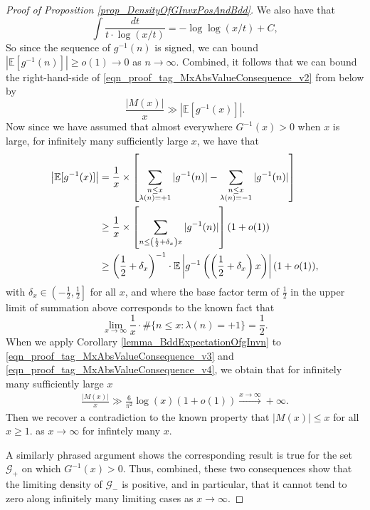 \documentclass[11pt,reqno,a4letter]{article}
\numberwithin{figure}{section}
\numberwithin{table}{section}
\theoremstyle{plain}
\numberwithin{theorem}{section}
\theoremstyle{definition}
\begin{document}
\begin{proof}[Proof of Proposition \ref{prop_DensityOfGInvxPosAndBdd}]
We also have that  
\[
\int \frac{dt}{t \cdot \log(x/t)} = -\log\log(x/t) + C, 
\]
So since the sequence of $g^{-1}(n)$ is signed, we can bound 
$|\mathbb{E}[g^{-1}(n)]| \geq o(1) \rightarrow 0$ as $n \rightarrow \infty$. 
Combined, it follows that we can bound the right-hand-side of 
\eqref{eqn_proof_tag_MxAbsValueConsequence_v2} from below by 
\begin{equation} 
\label{eqn_proof_tag_MxAbsValueConsequence_v3} 
\frac{|M(x)|}{x} \gg \left\lvert \mathbb{E}[g^{-1}(x)] \right\rvert. 
\end{equation} 
Now since we have assumed that almost everywhere $G^{-1}(x) > 0$ when $x$ is large, 
for infinitely many sufficiently large $x$, we have that 
\begin{align} 
\notag 
\left\lvert \mathbb{E}[g^{-1}(x)] \right\rvert & = \frac{1}{x} \times \left[ 
     \sum_{\substack{n \leq x \\ \lambda(n) = +1}} |g^{-1}(n)| - 
     \sum_{\substack{n \leq x \\ \lambda(n) = -1}} |g^{-1}(n)| \right] \\ 
\notag 
     & \geq \frac{1}{x} \times \left[\sum_{n \leq \left(\frac{1}{2} + \delta_x\right) x} |g^{-1}(n)|\right] (1 + o(1)) \\ 
\label{eqn_proof_tag_MxAbsValueConsequence_v4} 
     & \geq \left(\frac{1}{2} + \delta_x\right)^{-1} \cdot 
     \mathbb{E}\left\lvert g^{-1}\left(\left(\frac{1}{2} + \delta_x\right) x\right) \right\rvert (1 + o(1)), 
\end{align} 
with $\delta_x \in \left(-\frac{1}{2}, \frac{1}{2}\right]$ for all $x$, and where 
the base factor term of $\frac{1}{2}$ in the upper limit of summation above 
corresponds to the known fact that 
\[
\lim_{x \rightarrow \infty} \frac{1}{x} \cdot \#\{n \leq x: \lambda(n) = +1\} = \frac{1}{2}. 
\]
When we apply Corollary \ref{lemma_BddExpectationOfgInvn} to 
\eqref{eqn_proof_tag_MxAbsValueConsequence_v3} and 
\eqref{eqn_proof_tag_MxAbsValueConsequence_v4}, we obtain that for infinitely many 
sufficiently large $x$ 
\begin{align*} 
\frac{|M(x)|}{x} \gg \frac{6}{\pi^2} \log\left(x\right) (1 + o(1)) 
     \xrightarrow{x \rightarrow \infty} + \infty. 
\end{align*} 
Then we recover a contradiction to the known property that $|M(x)| \leq x$ 
for all $x \geq 1$. 
as $x \rightarrow \infty$ for 
infintely many $x$. 

A similarly phrased argument shows the corresponding result is true for the set $\mathcal{G}_{+}$ on which 
$G^{-1}(x) > 0$. 
Thus, combined, these two consequences show that the limiting density of $\mathcal{G}_{-}$ is positive, 
and in particular, that it cannot tend to zero along infinitely many limiting cases 
as $x \rightarrow \infty$. 
\end{proof} 
\end{document}
